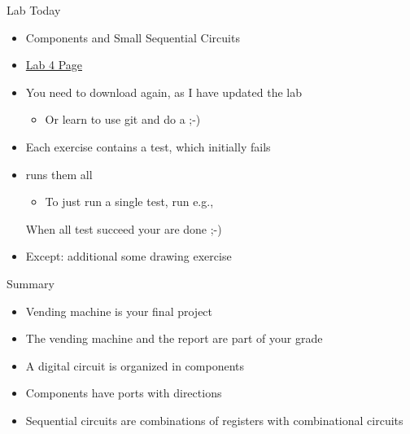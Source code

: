 \begin{frame}[fragile]{Lab Today}
\begin{itemize}
\item Components and Small Sequential Circuits
\item \href{https://github.com/schoeberl/chisel-lab/tree/master/lab4}{Lab 4 Page}
\item You need to download again, as I have updated the lab
\begin{itemize}
\item Or learn to use git and do a   ;-)
\end{itemize}
\item Each exercise contains a test, which initially fails
\item {} runs them all
\begin{itemize}
\item To just run a single test, run e.g.,\\
\end{itemize}
When all test succeed your are done ;-)
\item Except: additional some drawing exercise
\end{itemize}
\end{frame}

\begin{frame}[fragile]{Summary}
\begin{itemize}
\item Vending machine is your final project
\item The vending machine and the report are part of your grade
\item A digital circuit is organized in components
\item Components have ports with directions
\item Sequential circuits are combinations of registers with combinational circuits
\end{itemize}
\end{frame}

